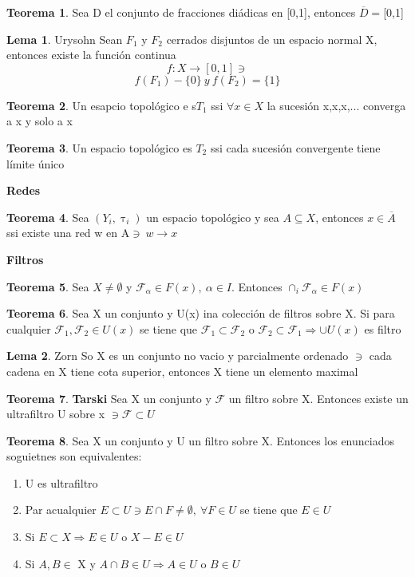 \documentclass{article}
\theoremstyle{definition}
\newtheorem{theorem}{Teorema}[section]
\newtheorem{lemma}{Lema}[section]
\begin{document}
\begin{theorem}
	Sea D el conjunto de fracciones diádicas en [0,1], entonces $\overline{D}=$[0,1]
\end{theorem}
\begin{lemma}{Urysohn}
	Sean $F_1$ y $F_2$ cerrados disjuntos de un espacio normal X, entonces existe la función continua 
	\[f:X\to[0,1]\ni\]
	\[f(F_1)-\{0\}\ y \ f(F_2)=\{1\}\]
\end{lemma}
\begin{theorem}
	Un esapcio topológico e s$T_1$ ssi $\forall x\in X$ la sucesión x,x,x,... converga a x y solo a x
\end{theorem}
\begin{theorem}
	Un espacio topológico es $T_2$ ssi cada sucesión convergente tiene límite único
\end{theorem}
\textbf{Redes}
\begin{theorem}
	Sea $(Y_i,\uptau_i)$ un espacio topológico y sea $A\subseteq X$, entonces $x\in \overline{A}$ ssi existe una red w en A$\ni\ w\to x$
\end{theorem}
\textbf{Filtros}
\begin{theorem}

	Sea $X\neq\emptyset$ y $\mathcal{F}_{\alpha}\in F(x),\ \alpha\in I$. Entonces $\cap_i\mathcal{F}_{\alpha}\in F(x)$
\end{theorem}
\begin{theorem}
	Sea X un conjunto y U(x) ina colección de filtros sobre X. Si para cualquier $\mathcal{F}_1,\mathcal{F}_2\in U(x)$ se tiene que $\mathcal{F}_1\subset\mathcal{F}_2$ o $\mathcal{F}_2\subset\mathcal{F}_1\Rightarrow \cup U(x)$ es filtro
\end{theorem}
\begin{lemma}{Zorn}
	So X es un conjunto no vacio y parcialmente ordenado $\ni$ cada cadena en X tiene cota superior, entonces X tiene un elemento maximal
\end{lemma}
\begin{theorem}{\textbf{Tarski}}
	Sea X un conjunto y $\mathcal{F}$ un filtro sobre X. Entonces existe un ultrafiltro U sobre x $\ni \mathcal{F}\subset U$
\end{theorem}
\begin{theorem}
	Sea X un conjunto y U un filtro sobre X. Entonces los enunciados soguietnes son equivalentes:
	\begin{enumerate}
		\item U es ultrafiltro
		\item Par acualquier $E\subset U\ni E\cap F\neq \emptyset,\ \forall F\in U$ se tiene que $E\in U$
		\item Si $E\subset X\Rightarrow E\in U$ o $X-E\in U$
		\item Si $A, B\in$ X y $ A\cap B\in U\Rightarrow A\in U$ o $ B\in U$
	\end{enumerate}
\end{theorem}
\end{document}
